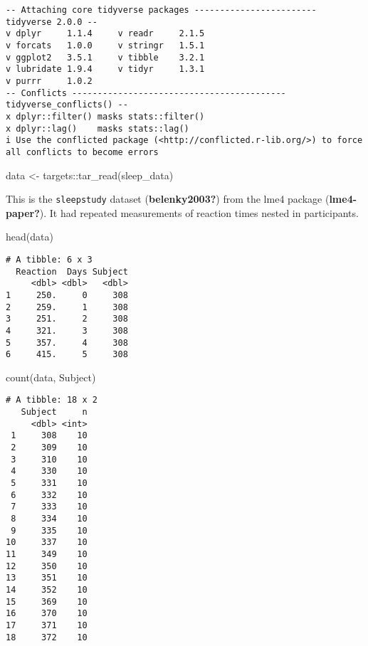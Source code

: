 \documentclass[
  letterpaper,
  DIV=11,
  numbers=noendperiod]{scrreprt}
\newenvironment{Shaded}{\begin{snugshade}}{\end{snugshade}}
\newcommand{\FunctionTok}[1]{\textcolor[rgb]{0.28,0.35,0.67}{#1}}
\newcommand{\NormalTok}[1]{\textcolor[rgb]{0.00,0.23,0.31}{#1}}
\newcommand{\OtherTok}[1]{\textcolor[rgb]{0.00,0.23,0.31}{#1}}
\newcommand{\SpecialCharTok}[1]{\textcolor[rgb]{0.37,0.37,0.37}{#1}}
\begin{document}
\begin{verbatim}
-- Attaching core tidyverse packages ------------------------ tidyverse 2.0.0 --
v dplyr     1.1.4     v readr     2.1.5
v forcats   1.0.0     v stringr   1.5.1
v ggplot2   3.5.1     v tibble    3.2.1
v lubridate 1.9.4     v tidyr     1.3.1
v purrr     1.0.2     
-- Conflicts ------------------------------------------ tidyverse_conflicts() --
x dplyr::filter() masks stats::filter()
x dplyr::lag()    masks stats::lag()
i Use the conflicted package (<http://conflicted.r-lib.org/>) to force all conflicts to become errors
\end{verbatim}

\begin{Shaded}
\begin{Highlighting}[]
\NormalTok{data }\OtherTok{\textless{}{-}}\NormalTok{ targets}\SpecialCharTok{::}\FunctionTok{tar\_read}\NormalTok{(sleep\_data)}
\end{Highlighting}
\end{Shaded}

This is the \texttt{sleepstudy} dataset (\textbf{belenky2003?}) from the
lme4 package (\textbf{lme4-paper?}). It had repeated measurements of
reaction times nested in participants.

\begin{Shaded}
\begin{Highlighting}[]
\FunctionTok{head}\NormalTok{(data)}
\end{Highlighting}
\end{Shaded}

\begin{verbatim}
# A tibble: 6 x 3
  Reaction  Days Subject
     <dbl> <dbl>   <dbl>
1     250.     0     308
2     259.     1     308
3     251.     2     308
4     321.     3     308
5     357.     4     308
6     415.     5     308
\end{verbatim}

\begin{Shaded}
\begin{Highlighting}[]
\FunctionTok{count}\NormalTok{(data, Subject)}
\end{Highlighting}
\end{Shaded}

\begin{verbatim}
# A tibble: 18 x 2
   Subject     n
     <dbl> <int>
 1     308    10
 2     309    10
 3     310    10
 4     330    10
 5     331    10
 6     332    10
 7     333    10
 8     334    10
 9     335    10
10     337    10
11     349    10
12     350    10
13     351    10
14     352    10
15     369    10
16     370    10
17     371    10
18     372    10
\end{verbatim}
\end{document}
